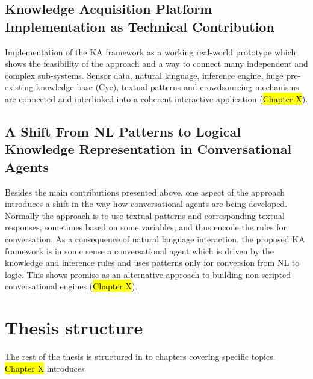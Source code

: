 \subsection{Knowledge Acquisition Platform Implementation as Technical Contribution }
Implementation of the KA framework as a working real-world prototype which shows the feasibility of the approach and a way to connect many independent and complex sub-systems. Sensor data, natural language, inference engine, huge pre-existing knowledge base (Cyc)\parencite{Lenat1995}, textual patterns and crowdsourcing mechanisms are connected and interlinked into a coherent interactive application (\hl{Chapter X}).

\subsection{A Shift From NL Patterns to Logical Knowledge Representation in Conversational Agents}
Besides the main contributions presented above, one aspect of the approach introduces a shift in the way how conversational agents are being developed. Normally the approach is to use textual patterns and corresponding textual responses, sometimes based on some variables, and thus encode the rules for conversation. As a consequence of natural language interaction, the proposed KA framework is in some sense a conversational agent which is driven by the knowledge and inference rules and uses patterns only for conversion from NL to logic. This shows promise as an alternative approach to building non scripted conversational engines (\hl{Chapter X}).

\section{Thesis structure}
The rest of the thesis is structured in to chapters covering specific topics. \hl{Chapter X} introduces
